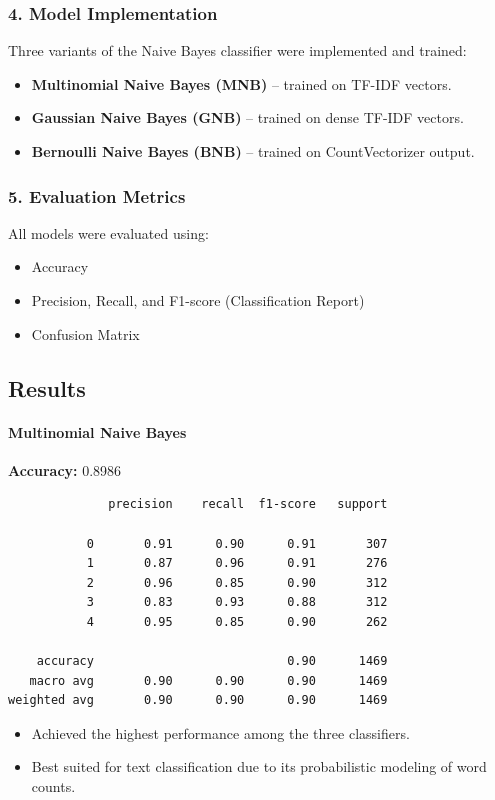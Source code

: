 \documentclass[a4paper,12pt]{article}
\begin{document}
\subsubsection*{4. Model Implementation}
Three variants of the Naive Bayes classifier were implemented and trained:
\begin{itemize}
    \item \textbf{Multinomial Naive Bayes (MNB)} – trained on TF-IDF vectors.
    \item \textbf{Gaussian Naive Bayes (GNB)} – trained on dense TF-IDF vectors.
    \item \textbf{Bernoulli Naive Bayes (BNB)} – trained on CountVectorizer output.
\end{itemize}

\subsubsection*{5. Evaluation Metrics}
All models were evaluated using:
\begin{itemize}
    \item Accuracy
    \item Precision, Recall, and F1-score (Classification Report)
    \item Confusion Matrix
\end{itemize}

\subsection{Results}

\paragraph{Multinomial Naive Bayes\\}

\textbf{Accuracy:} 0.8986

\begin{verbatim}
              precision    recall  f1-score   support

           0       0.91      0.90      0.91       307
           1       0.87      0.96      0.91       276
           2       0.96      0.85      0.90       312
           3       0.83      0.93      0.88       312
           4       0.95      0.85      0.90       262

    accuracy                           0.90      1469
   macro avg       0.90      0.90      0.90      1469
weighted avg       0.90      0.90      0.90      1469
\end{verbatim}
\begin{itemize}
    \item Achieved the highest performance among the three classifiers.
    \item Best suited for text classification due to its probabilistic modeling of word counts.
\end{itemize}
\end{document}
